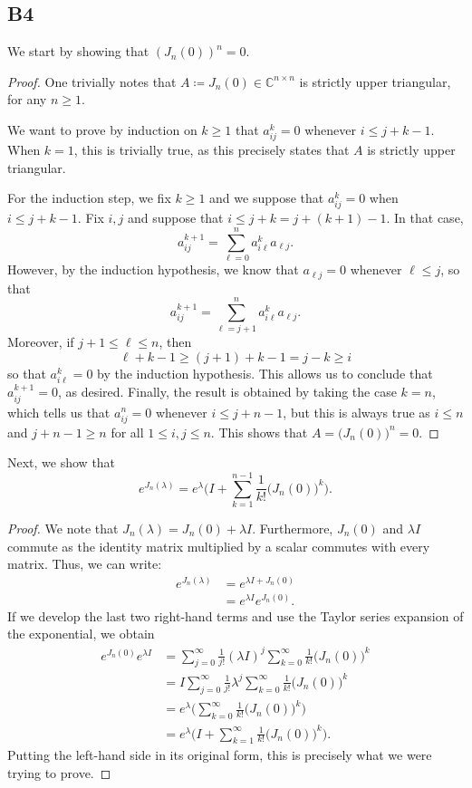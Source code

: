 \documentclass[11pt]{article}
\newcommand{\complex}{\mathbb{C}} %
\begin{document}
\subsection*{B4}
We start by showing that \((J_n(0))^n=0\).
\begin{proof}
One trivially notes that \(A \coloneqq J_n(0) \in \complex^{n \times n}\) is strictly upper triangular, for any \(n \geqslant 1\).

We want to prove by induction on \(k \geqslant 1\) that \(a_{ij}^k = 0\) whenever \(i \leqslant j + k - 1\).
When \(k = 1\), this is trivially true, as this precisely states that \(A\) is strictly upper triangular.

For the induction step, we fix \(k \geqslant 1\) and we suppose that \(a_{ij}^k = 0\) when \(i \leqslant j + k - 1\).
Fix \(i, j\) and suppose that \(i \leqslant j + k = j + (k + 1) - 1\).
In that case,
\[
a_{ij}^{k+1} = \sum_{\ell = 0}^n a_{i \ell}^k a_{\ell j}.
\]
However, by the induction hypothesis, we know that \(a_{\ell j} = 0\) whenever \(\ell \leqslant j\), so that
\[
a_{ij}^{k+1} = \sum_{\ell = j + 1}^n a_{i \ell}^k a_{\ell j}.
\]
Moreover, if \(j+1 \leqslant \ell \leqslant n\), then
\[
\ell + k - 1 \geqslant (j + 1) + k - 1 = j - k \geqslant i
\]
so that \(a_{i \ell}^k = 0\) by the induction hypothesis.
This allows us to conclude that \(a_{ij}^{k+1} = 0\), as desired.
Finally, the result is obtained by taking the case \(k = n\), which tells us that \(a_{ij}^n = 0\) whenever \(i \leqslant j + n - 1\), but this is always true as \(i \leqslant n\) and \(j + n - 1 \geqslant n\) for all \(1 \leqslant i, j \leqslant n\).
This shows that \(A = \Big(J_n(0)\Big)^n = 0\).
\end{proof}

Next, we show that
\[
    e^{J_n(\lambda)}=e^{\lambda}\Bigg(I+\sum_{k=1}^{n-1}\frac{1}{k!}\Big(J_n(0)\Big)^k\Bigg).
\]
\begin{proof}
We note that $J_n(\lambda)=J_n(0)+\lambda I$.
Furthermore, $J_n(0)$ and $\lambda I$ commute as the identity matrix multiplied by a scalar commutes with every matrix.
Thus, we can write:
\begin{align*}
    e^{J_n(\lambda)}&=e^{\lambda I+J_n(0)}\\
    &=e^{\lambda I}e^{J_n(0)}.
\end{align*}
If we develop the last two right-hand terms and use the Taylor series expansion of the exponential, we obtain
\begin{align*}
    e^{J_n(0)}e^{\lambda I}&=\sum_{j=0}^{\infty}\frac{1}{j!}(\lambda I)^j\sum_{k=0}^{\infty}\frac{1}{k!}\Big(J_n(0)\Big)^k\\
    &=I\sum_{j=0}^{\infty}\frac{1}{j!}\lambda ^j\sum_{k=0}^{\infty}\frac{1}{k!}\Big(J_n(0)\Big)^k\\
    &=e^{\lambda}\Bigg(\sum_{k=0}^{\infty}\frac{1}{k!}\Big(J_n(0)\Big)^k\Bigg)\\
    &=e^{\lambda}\Bigg(I+\sum_{k=1}^{\infty}\frac{1}{k!}\Big(J_n(0)\Big)^k\Bigg).
\end{align*}
Putting the left-hand side in its original form, this is precisely what we were trying to prove.
\end{proof}
\end{document}
